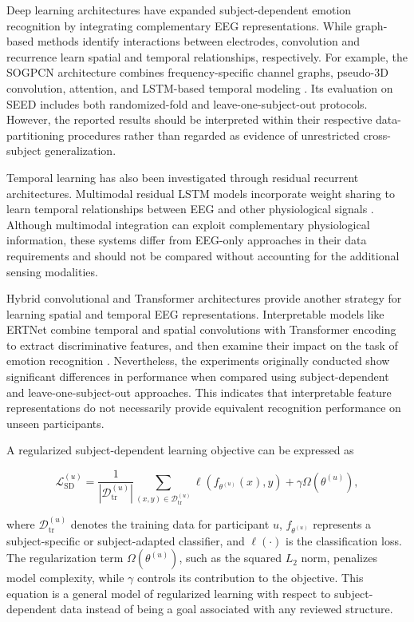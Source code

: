 \documentclass[ASNA,twocolumn]{USG}
\begin{document}
Deep learning architectures have expanded subject-dependent emotion recognition by integrating complementary EEG representations. While graph-based methods identify interactions between electrodes, convolution and recurrence learn spatial and temporal relationships, respectively. For example, the SOGPCN architecture combines frequency-specific channel graphs, pseudo-3D convolution, attention, and LSTM-based temporal modeling \cite{zhu2024eeg}. Its evaluation on SEED includes both randomized-fold and leave-one-subject-out protocols. However, the reported results should be interpreted within their respective data-partitioning procedures rather than regarded as evidence of unrestricted cross-subject generalization.

Temporal learning has also been investigated through residual recurrent architectures. Multimodal residual LSTM models incorporate weight sharing to learn temporal relationships between EEG and other physiological signals \cite{ma2019emotion}. Although multimodal integration can exploit complementary physiological information, these systems differ from EEG-only approaches in their data requirements and should not be compared without accounting for the additional sensing modalities.

Hybrid convolutional and Transformer architectures provide another strategy for learning spatial and temporal EEG representations. Interpretable models like ERTNet combine temporal and spatial convolutions with Transformer encoding to extract discriminative features, and then examine their impact on the task of emotion recognition \cite{liu2024ertnet}. Nevertheless, the experiments originally conducted show significant differences in performance when compared using subject-dependent and leave-one-subject-out approaches. This indicates that interpretable feature representations do not necessarily provide equivalent recognition performance on unseen participants.

A regularized subject-dependent learning objective can be expressed as

\begin{equation}
\mathcal{L}_{\mathrm{SD}}^{(u)}
=
\frac{1}{|\mathcal{D}_{\mathrm{tr}}^{(u)}|}
\sum_{(x,y)\in\mathcal{D}_{\mathrm{tr}}^{(u)}}
\ell\left(f_{\theta^{(u)}}(x),y\right)
+
\gamma\Omega\left(\theta^{(u)}\right),
\label{eq:subject_dependent_objective}
\end{equation}

where $\mathcal{D}_{\mathrm{tr}}^{(u)}$ denotes the training data for participant $u$, $f_{\theta^{(u)}}$ represents a subject-specific or subject-adapted classifier, and $\ell(\cdot)$ is the classification loss. The regularization term $\Omega(\theta^{(u)})$, such as the squared $L_2$ norm, penalizes model complexity, while $\gamma$ controls its contribution to the objective. This equation is a general model of regularized learning with respect to subject-dependent data instead of being a goal associated with any reviewed structure.
\end{document}
